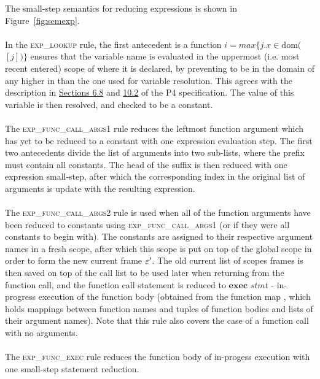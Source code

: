\documentclass[UTF8]{article}
\begin{document}
The small-step semantics for reducing expressions is shown in Figure~\ref{fig:semexp}.
\\~\\
In the \textsc{exp\_lookup} rule, the first antecedent is a function $i = max  \{ j . x  \in \mathrm{dom} ( $\currsf$ [j] ) \} $  ensures that the variable name \str{} is evaluated in the uppermost (i.e. most recent entered) scope of \currsf{} where it is declared, by preventing \str{} to be in the domain of any \scope{} higher in \currsf{} than the one used for variable resolution. This agrees with the description in \href{https://p4.org/p4-spec/docs/P4-16-v1.2.1.html#sec-name-resolution}{Sections 6.8} and \href{https://p4.org/p4-spec/docs/P4-16-v1.2.1.html#sec-variables}{10.2} of the P4 specification. The value of this variable is then resolved, and checked to be a constant.\\~\\
The \textsc{exp\_func\_call\_args1} rule reduces the leftmost function argument which has yet to be reduced to a constant with one expression evaluation step. The first two antecedents divide the list of arguments into two sub-lists, where the prefix must contain all constants. The head of the suffix is then reduced with one expression small-step, after which the corresponding index in the original list of arguments is update with the resulting expression.
\\~\\
The \textsc{exp\_func\_call\_args2} rule is used when all of the function arguments have been reduced to constants using \textsc{exp\_func\_call\_args1} (or if they were all constants to begin with). The constants are assigned to their respective argument names in a fresh scope, after which this scope is put on top of the global scope \gscope{} in order to form the new current frame $\varepsilon '$. The old current list of scopes frames \currsf{} is then saved on top of the call list \cstack{} to be used later when returning from the function call, and the function call statement is reduced to $\mathbf{exec} \,\, \mathit{stmt}$ - in-progress execution of the function body \stmt{} (obtained from the function map \fmap{}, which holds mappings between function names \str{} and tuples of function bodies and lists of their argument names). Note that this rule also covers the case of a function call with no arguments.
\\~\\
The \textsc{exp\_func\_exec} rule reduces the function body of in-progess execution with one small-step statement reduction.
\end{document}
